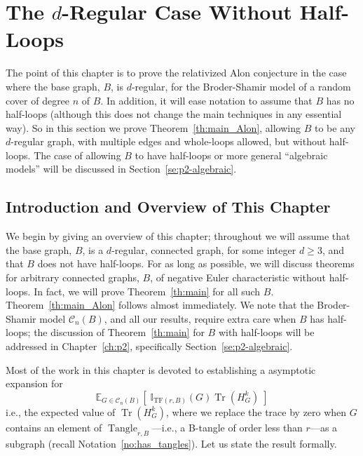 \documentclass{memo-l}
\theoremstyle{plain}
\theoremstyle{definition}
\numberwithin{section}{chapter}
\numberwithin{equation}{chapter}
\newcommand{\expect}[2]{{\mathbb{E}}_{#1}{\left[\; #2\; \right]}}
\newcommand{\tanglefreeindicator}{\II_{\mathrm{TF}(r,B)}} %
\DeclareMathOperator{\Tr}{Tr}
\DeclareMathOperator{\Tangle}{Tangle}
\theoremstyle{plain}
\theoremstyle{definition}
\newcommand\II{\mathbb{I}}
\newcommand\cC{\mathcal{C}}
\begin{document}


%
\chapter{The $d$-Regular Case Without Half-Loops}
\label{ch:p1}

The point of this chapter is to prove 
the relativized Alon conjecture in the case where the base graph, $B$,
is $d$-regular, for the Broder-Shamir model of a random cover of degree
$n$ of $B$.
In addition, it will ease notation to assume that $B$ has no half-loops
(although this does not change the main techniques in any essential
way).
So in this section we prove Theorem~\ref{th:main_Alon}, allowing $B$ to
be any $d$-regular graph, with multiple edges and whole-loops allowed,
but without half-loops.  The case of allowing $B$ to have half-loops
or more general ``algebraic models'' will be discussed 
in Section~\ref{se:p2-algebraic}.

\section{Introduction and Overview of This Chapter}\label{section:introduction}
\label{se:p1-intro}

We begin by giving an overview of this chapter; throughout we will
assume that the base graph, $B$, is a $d$-regular, connected graph,
for some integer $d\ge 3$, and that $B$ does not have half-loops.
For as long as possible, we will discuss theorems for arbitrary
connected graphs, $B$, of negative Euler characteristic without half-loops.
In fact, we will prove Theorem~\ref{th:main} for all such $B$.
Theorem~\ref{th:main_Alon} follows almost immediately.
We note that the Broder-Shamir model $\cC_n(B)$, and all our results,
require extra care when $B$ has half-loops;
the discussion of Theorem~\ref{th:main} for $B$ with half-loops will
be addressed in Chapter~\ref{ch:p2}, specifically 
Section~\ref{se:p2-algebraic}.


Most of the work in this chapter is devoted to establishing a
\gls{asymptotic expansion} for 
$$
\expect{G\in\cC_n(B)}{\tanglefreeindicator(G)\Tr(H_G^k)} 
$$
i.e., the
expected value of \( \Tr(H_G^k) \), where we replace the trace by zero when
\( G \) contains an element of 
\( \Tangle_{r,B} \)---i.e., a \gls{B-tangle} of \gls{order}
less than $r$---as a subgraph (recall Notation~\ref{no:has_tangles}). 
Let us state the result formally.
\end{document}
